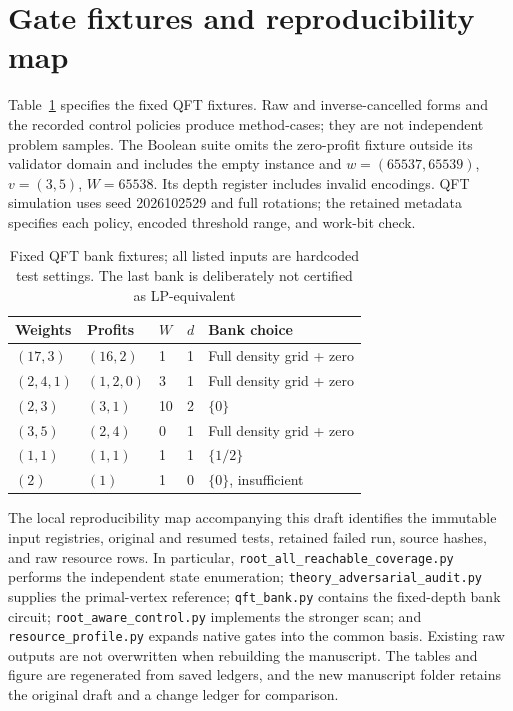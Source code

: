 \documentclass[referee,pdflatex,sn-mathphys-num]{sn-jnl}
\theoremstyle{thmstyleone}
\theoremstyle{thmstyletwo}
\begin{document}
\section{Gate fixtures and reproducibility map}\label{app:reproduce}
Table~\ref{tab:fixtures} specifies the fixed QFT fixtures. Raw and inverse-cancelled forms and the recorded control policies produce method-cases; they are not independent problem samples. The Boolean suite omits the zero-profit fixture outside its validator domain and includes the empty instance and $w=(65537,65539)$, $v=(3,5)$, $W=65538$. Its depth register includes invalid encodings. QFT simulation uses seed 2026102529 and full rotations; the retained metadata specifies each policy, encoded threshold range, and work-bit check.

\begin{table}[t]
\caption{Fixed QFT bank fixtures; all listed inputs are hardcoded test settings. The last bank is deliberately not certified as LP-equivalent}\label{tab:fixtures}
\centering\small
\begin{tabular}{lllll}
\toprule
Weights & Profits & $W$ & $d$ & Bank choice\\
\midrule
$(17,3)$ & $(16,2)$ & 1 & 1 & Full density grid + zero\\
$(2,4,1)$ & $(1,2,0)$ & 3 & 1 & Full density grid + zero\\
$(2,3)$ & $(3,1)$ & 10 & 2 & $\{0\}$\\
$(3,5)$ & $(2,4)$ & 0 & 1 & Full density grid + zero\\
$(1,1)$ & $(1,1)$ & 1 & 1 & $\{1/2\}$\\
$(2)$ & $(1)$ & 1 & 0 & $\{0\}$, insufficient\\
\bottomrule
\end{tabular}
\end{table}

The local reproducibility map accompanying this draft identifies the immutable input registries, original and resumed tests, retained failed run, source hashes, and raw resource rows. In particular, \texttt{root\_all\_reachable\_coverage.py} performs the independent state enumeration; \texttt{theory\_adversarial\_audit.py} supplies the primal-vertex reference; \texttt{qft\_bank.py} contains the fixed-depth bank circuit; \texttt{root\_aware\_control.py} implements the stronger scan; and \texttt{resource\_profile.py} expands native gates into the common basis. Existing raw outputs are not overwritten when rebuilding the manuscript. The tables and figure are regenerated from saved ledgers, and the new manuscript folder retains the original draft and a change ledger for comparison.


\end{document}

